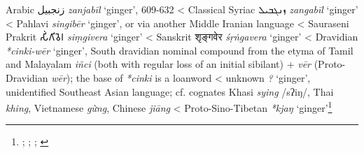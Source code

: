 \begin{etymology}\label{ety:zanjabil}
Arabic {زنجبيل} \textit{zanjabīl} `ginger', 609-632
< Classical Syriac {ܙܢܓܒܝܠ} \textit{zangabīl} `ginger'
< Pahlavi \textit{singibēr} `ginger', or via another Middle Iranian language
< Sauraseni Prakrit {𑀲𑀺𑀁𑀕𑀺𑀯𑁂𑀭} \textit{siṃgivera} `ginger'
< Sanskrit {शृङ्गवेर} \textit{śṛṅgavera} `ginger'
< Dravidian \textit{*cinki-wēr} `ginger', South dravidian nominal compound  from the etyma of Tamil and Malayalam \textit{iñci} (both with regular loss of an initial sibilant) + \textit{vēr} (Proto-Dravidian \textit{wēr}); the base of \textit{*cinki} is a loanword
< unknown \textit{?} `ginger', unidentified Southeast Asian language; cf. cognates Khasi \textit{sying} /sʔiŋ/, Thai \textit{khing}, Vietnamese \textit{gừng}, Chinese \textit{jiāng}
< Proto-Sino-Tibetan \textit{*kjaŋ} `ginger'\footnote{\textcite{cal}; \textcite[90]{ciancaglini_iranian_2008}; \textcite[5]{krishnamurti_dravidian_2003}; \textcite{oed}}
\end{etymology}